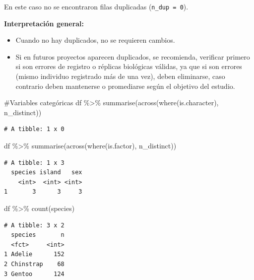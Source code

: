 \documentclass[
  spanish,
  11pt,
  a4paper,
  DIV=11,
  numbers=noendperiod]{scrartcl}
\newenvironment{Shaded}{\begin{snugshade}}{\end{snugshade}}
\newcommand{\CommentTok}[1]{\textcolor[rgb]{0.37,0.37,0.37}{#1}}
\newcommand{\FunctionTok}[1]{\textcolor[rgb]{0.28,0.35,0.67}{#1}}
\newcommand{\NormalTok}[1]{\textcolor[rgb]{0.00,0.23,0.31}{#1}}
\newcommand{\SpecialCharTok}[1]{\textcolor[rgb]{0.37,0.37,0.37}{#1}}
\begin{document}
En este caso no se encontraron filas duplicadas (\texttt{n\_dup\ =\ 0}).

\textbf{Interpretación general:}

\begin{itemize}
\item
  Cuando no hay duplicados, no se requieren cambios.
\item
  Si en futuros proyectos aparecen duplicados, se recomienda, verificar
  primero si son errores de registro o réplicas biológicas válidas, ya
  que si son errores (mismo individuo registrado más de una vez), deben
  eliminarse, caso contrario deben mantenerse o promediarse según el
  objetivo del estudio.
\end{itemize}

\begin{Shaded}
\begin{Highlighting}[numbers=left,,]
\CommentTok{\#Variables categóricas}
\NormalTok{df }\SpecialCharTok{\%\textgreater{}\%} \FunctionTok{summarise}\NormalTok{(}\FunctionTok{across}\NormalTok{(}\FunctionTok{where}\NormalTok{(is.character), n\_distinct))}
\end{Highlighting}
\end{Shaded}

\begin{verbatim}
# A tibble: 1 x 0
\end{verbatim}

\begin{Shaded}
\begin{Highlighting}[numbers=left,,]
\NormalTok{df }\SpecialCharTok{\%\textgreater{}\%} \FunctionTok{summarise}\NormalTok{(}\FunctionTok{across}\NormalTok{(}\FunctionTok{where}\NormalTok{(is.factor), n\_distinct))}
\end{Highlighting}
\end{Shaded}

\begin{verbatim}
# A tibble: 1 x 3
  species island   sex
    <int>  <int> <int>
1       3      3     3
\end{verbatim}

\begin{Shaded}
\begin{Highlighting}[numbers=left,,]
\NormalTok{df }\SpecialCharTok{\%\textgreater{}\%} \FunctionTok{count}\NormalTok{(species)}
\end{Highlighting}
\end{Shaded}

\begin{verbatim}
# A tibble: 3 x 2
  species       n
  <fct>     <int>
1 Adelie      152
2 Chinstrap    68
3 Gentoo      124
\end{verbatim}
\end{document}

